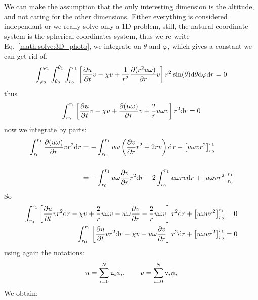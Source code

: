 We can make the assumption that the only interesting dimension is the altitude, and
not caring for the other dimensions. Either everything
is considered independant or we really solve only a 1D problem, still,
the natural coordinate system is the spherical
coordinates system, thus we re-write Eq.~\ref{math:solve:3D_photo}, 
we integrate on $\theta$ and $\varphi$,
which gives a constant we can get rid of.
\begin{equation}
\int_{\varphi_0}^{\varphi_1}\int_{\theta_0}^{\theta_1}\int_{r_0}^{r_1}\left[   \frac{\partial u}{\partial t} v 
                       - \chi v + \frac{1}{r^2}\frac{\partial(r^2u\omega)}{\partial r} v
                \right] r^2\sin(\theta)\mathrm{d}\theta\mathrm{d}\varphi\mathrm{d} r = 0
\end{equation}
thus
\begin{equation}
\int_{r_0}^{r_1}\left[   \frac{\partial u}{\partial t} v 
                       - \chi v + \frac{\partial(u\omega)}{\partial r} v
                       + \frac{2}{r}u\omega v
                \right] r^2\mathrm{d} r = 0
\end{equation}
now we integrate by parts:
\begin{equation}
\begin{split}
\int_{r_0}^{r_1}\frac{\partial(u\omega)}{\partial r} v r^2 \mathrm{d} r 
   & = - \int_{r_0}^{r_1}u\omega \left(\frac{\partial v}{\partial r}r^2 + 2 r v\right) \mathrm{d} r + \left[u\omega v r^2\right]_{r_0}^{r_1}
        \\[\baselineskip]
   & = - \int_{r_0}^{r_1}u\omega \frac{\partial v}{\partial r} r^2  \mathrm{d} r - 2 \int_{r_0}^{r_1}u\omega  r v \mathrm{d} r  + \left[u\omega v r^2\right]_{r_0}^{r_1}
\end{split}
\end{equation}
So
\begin{equation}
\begin{split}
\int_{r_0}^{r_1} \left[   \frac{\partial u}{\partial t} v r^2 \mathrm{d} r
                        - \chi v
                        + \frac{2}{r} u\omega v
                        - u\omega\frac{\partial v}{\partial r}
                        - \frac{2}{r} u\omega v
                 \right] r^2 \mathrm{d} r 
     + \left[u\omega v r^2\right]_{r_0}^{r_1}   & = 0 \\
\int_{r_0}^{r_1} \left[   \frac{\partial u}{\partial t} v r^2 \mathrm{d} r
                        - \chi v
                        - u\omega\frac{\partial v}{\partial r}
                 \right] r^2 \mathrm{d} r 
     + \left[u\omega v r^2\right]_{r_0}^{r_1}   & = 0 
\end{split}
\end{equation}
using again the notations:
\begin{equation}
u = \sum_{i=0}^{N} \mathtt{u}_i \phi_i, \qquad v = \sum_{i=0}^{N} \mathtt{v}_i \phi_i
\end{equation}
We obtain:
